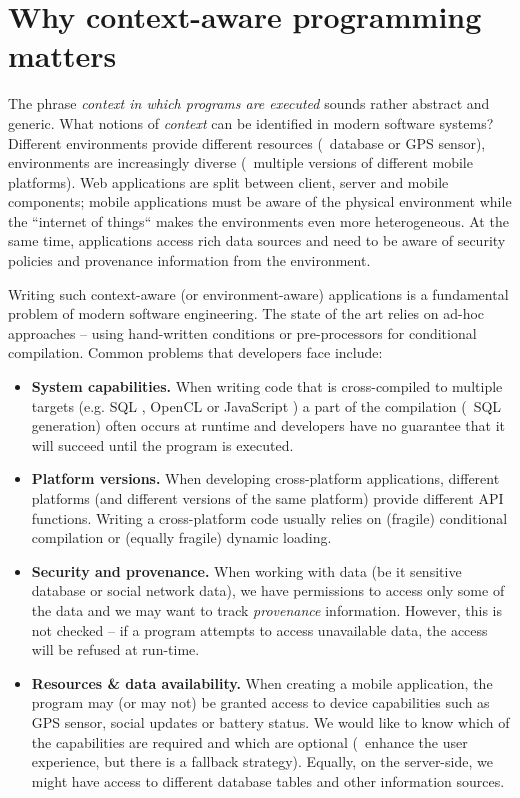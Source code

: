 
\section{Why context-aware programming matters}

The phrase \emph{context in which programs are executed} sounds rather abstract and generic.
What notions of \emph{context} can be identified in modern software systems?
Different environments provide different resources (\eg~database
or GPS sensor), environments are increasingly diverse (\eg~multiple versions of different
mobile platforms). Web applications are split between client, server and mobile components; mobile
applications must be aware of the physical environment while the ``internet
of things`` makes the environments even more heterogeneous. At the same time, applications access
rich data sources and need to be aware of security policies and provenance information from the
environment.

Writing such context-aware (or environment-aware) applications is a fundamental problem of modern 
software engineering. The state of the art relies on ad-hoc approaches -- using hand-written conditions 
or pre-processors for conditional compilation. Common problems that developers face include: 

\begin{itemize}
\item \textbf{System capabilities.} When writing code that is cross-compiled to multiple 
  targets (e.g. SQL \cite{app-linq}, OpenCL or JavaScript \cite{app-hop-lang}) a part of the compilation 
  (\eg~SQL generation) often occurs at runtime and developers have no guarantee that it will succeed 
  until the program is executed.  
  
\item \textbf{Platform versions.} When developing cross-platform applications, different platforms
  (and different versions of the same platform) provide different API functions. Writing a 
  cross-platform code usually relies on (fragile) conditional compilation or (equally fragile) 
  dynamic loading.
      
\item \textbf{Security and provenance.} When working with data (be it sensitive database or social 
   network data), we have permissions to access only some of the data and we may want to track 
   \emph{provenance} information. However, this is not checked -- if a program attempts to access 
   unavailable data, the access will be refused at run-time.
  
\item \textbf{Resources \& data availability.} When creating a mobile application, the program may
  (or may not) be granted access to device capabilities such as GPS sensor, social updates or battery
  status. We would like to know which of the capabilities are required and which are optional
  (\ie~enhance the user experience, but there is a fallback strategy). Equally, on the server-side,
  we might have access to different database tables and other information sources.
\end{itemize}

